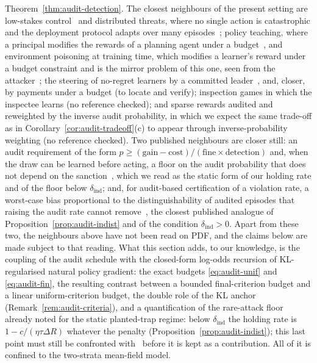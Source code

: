 \begin{remark}
Theorem~\ref{thm:audit-detection}. The closest neighbours of the present setting are low-stakes control~\cite{christiano2021lowstakes} and distributed threats, where no single action is catastrophic and the deployment protocol adapts over many episodes~\cite{wen2024adaptive}; policy teaching, where a principal modifies the rewards of a planning agent under a budget~\cite{zhang2008policyteaching}, and environment poisoning at training time, which modifies a learner's reward under a budget constraint and is the mirror problem of this one, seen from the attacker~\cite{rakhsha2020poisoning}; the steering of no-regret learners by a committed leader~\cite{deng2019strategizing}, and, closer, by payments under a budget (to locate and verify); inspection games in which the inspectee learns (no reference checked); and sparse rewards audited and reweighted by the inverse audit probability, in which we expect the same trade-off as in Corollary~\ref{cor:audit-tradeoff}(c) to appear through inverse-probability weighting (no reference checked). Two published neighbours are closer still: an audit requirement of the form $p\ge(\text{gain}-\text{cost})/(\text{fine}\times\text{detection})$ and, when the draw can be learned before acting, a floor on the audit probability that does not depend on the sanction~\cite{gans2026randomized}, which we read as the static form of our holding rate and of the floor below $\delta_{\mathrm{ind}}$; and, for audit-based certification of a violation rate, a worst-case bias proportional to the distinguishability of audited episodes that raising the audit rate cannot remove~\cite{zhu2026blindfold}, the closest published analogue of Proposition~\ref{prop:audit-indist} and of the condition $\delta_{\mathrm{ind}}>0$. Apart from these two, the neighbours above have not been read on PDF, and the claims below are made subject to that reading. What this section adds, to our knowledge, is
the coupling of the audit schedule with the closed-form log-odds recursion of
KL-regularised natural policy gradient: the exact budgets
\eqref{eq:audit-unif} and \eqref{eq:audit-fin}, the resulting contrast between
a bounded final-criterion budget and a linear uniform-criterion budget, the
double role of the KL anchor (Remark~\ref{rem:audit-criteria}), and a quantification of the rare-attack floor already noted for the static planted-trap regime: below $\delta_{\mathrm{ind}}$ the holding rate is $1-c/(\eta\tau\Delta R)$ whatever the penalty (Proposition~\ref{prop:audit-indist}); this last point must still be confronted with~\cite{gans2026randomized,zhu2026blindfold} before it is kept as a contribution. All of it is
confined to the two-strata mean-field model.
\end{remark}

